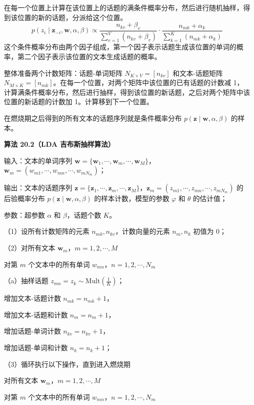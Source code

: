 \documentclass[UTF8,12pt,a4paper,fontset=fandol]{ctexart}
\begin{document}
在每一个位置上计算在该位置上的话题的满条件概率分布，然后进行随机抽样，得到该位置的新的话题，分派给这个位置。
\[
p(z_i\mid\mathbf{z}_{-i},\mathbf{w},\alpha,\beta)\propto \frac{n_{kv}+\beta_v}{\sum_{v=1}^V(n_{kv}+\beta_v)}\cdot \frac{n_{mk}+\alpha_k}{\sum_{k=1}^K(n_{mk}+\alpha_k)}
\]
这个条件概率分布由两个因子组成，第一个因子表示话题生成该位置的单词的概率，第二个因子表示该位置的文本生成话题的概率。

整体准备两个计数矩阵：话题-单词矩阵 $N_{K\times V}=[n_{kv}]$ 和文本-话题矩阵 $N_{M\times K}=[n_{mk}]$。在每一个位置，对两个矩阵中该位置的已有话题的计数减 1，计算满条件概率分布，然后进行抽样，得到该位置的新话题，之后对两个矩阵中该位置的新话题的计数加 1。计算移到下一个位置。

在燃烧期之后得到的所有文本的话题序列就是条件概率分布 $p(\mathbf{z}\mid\mathbf{w},\alpha,\beta)$ 的样本。

\noindent\textbf{算法 20.2（LDA 吉布斯抽样算法）}

输入：文本的单词序列 $\mathbf{w}=\{\mathbf{w}_1,\cdots,\mathbf{w}_m,\cdots,\mathbf{w}_M\}$，$\mathbf{w}_m=(w_{m1},\cdots,w_{mn},\cdots,w_{mN_m})$；

输出：文本的话题序列 $\mathbf{z}=\{\mathbf{z}_1,\cdots,\mathbf{z}_m,\cdots,\mathbf{z}_M\}$，$\mathbf{z}_m=(z_{m1},\cdots,z_{mn},\cdots,z_{mN_m})$ 的后验概率分布 $p(\mathbf{z}\mid\mathbf{w},\alpha,\beta)$ 的样本计数，模型的参数 $\varphi$ 和 $\theta$ 的估计值；

参数：超参数 $\alpha$ 和 $\beta$，话题个数 $K$。

（1）设所有计数矩阵的元素 $n_{mk},n_{kv}$，计数向量的元素 $n_m,n_k$ 初值为 0；

（2）对所有文本 $\mathbf{w}_m$，$m=1,2,\cdots,M$

\quad 对第 $m$ 个文本中的所有单词 $w_{mn}$，$n=1,2,\cdots,N_m$

\quad （a）抽样话题 $z_{mn}=z_k\sim \mathrm{Mult}\left(\frac{1}{K}\right)$；

\quad 增加文本-话题计数 $n_{mk}=n_{mk}+1$，

\quad 增加文本-话题和计数 $n_m=n_m+1$，

\quad 增加话题-单词计数 $n_{kv}=n_{kv}+1$，

\quad 增加话题-单词和计数 $n_k=n_k+1$；

（3）循环执行以下操作，直到进入燃烧期

\quad 对所有文本 $\mathbf{w}_m$，$m=1,2,\cdots,M$

\quad 对第 $m$ 个文本中的所有单词 $w_{mn}$，$n=1,2,\cdots,N_m$
\end{document}
